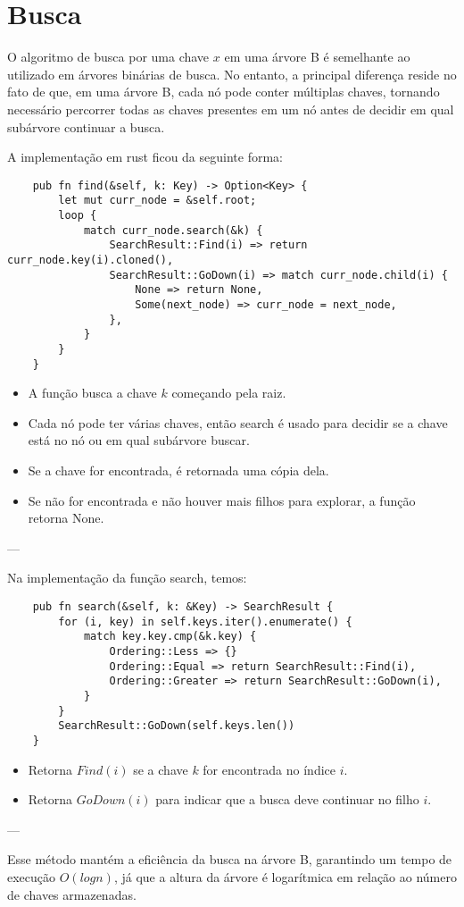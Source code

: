 \section{Busca}

O algoritmo de busca por uma chave \( x \) em uma árvore B é semelhante ao utilizado em árvores binárias 
de busca. No entanto, a principal diferença reside no fato de que, em uma árvore B, cada nó pode conter 
múltiplas chaves, tornando necessário percorrer todas as chaves presentes em um nó antes de decidir 
em qual subárvore continuar a busca. 

A implementação em rust ficou da seguinte forma:

\begin{lstlisting}
    pub fn find(&self, k: Key) -> Option<Key> {
        let mut curr_node = &self.root;
        loop {
            match curr_node.search(&k) {
                SearchResult::Find(i) => return curr_node.key(i).cloned(),
                SearchResult::GoDown(i) => match curr_node.child(i) {
                    None => return None,
                    Some(next_node) => curr_node = next_node,
                },
            }
        }
    }
\end{lstlisting}

\begin{itemize}
    \item A função busca a chave \( k \) começando pela raiz.
    \item Cada nó pode ter várias chaves, então search é 
    usado para decidir se a chave está no nó ou em qual subárvore buscar.
    \item Se a chave for encontrada, é retornada uma cópia dela.
    \item Se não for encontrada e não houver mais filhos para explorar, a função retorna None.
\end{itemize}
---

Na implementação da função search, temos:

\begin{lstlisting}
    pub fn search(&self, k: &Key) -> SearchResult {
        for (i, key) in self.keys.iter().enumerate() {
            match key.key.cmp(&k.key) {
                Ordering::Less => {}
                Ordering::Equal => return SearchResult::Find(i),
                Ordering::Greater => return SearchResult::GoDown(i),
            }
        }
        SearchResult::GoDown(self.keys.len())
    }
\end{lstlisting}

\begin{itemize}
    \item Retorna $Find(i)$ se a chave \( k \) for encontrada no índice \( i \). 
    \item Retorna $GoDown(i)$ para indicar que a busca deve continuar no filho \( i \).
\end{itemize}
---

Esse método mantém a eficiência da busca na árvore B, garantindo um tempo de execução 
$O(logn)$, já que a altura da árvore é logarítmica em relação ao número de chaves armazenadas.
